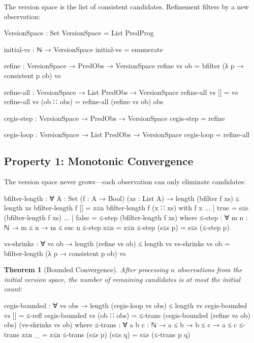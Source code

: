 \documentclass[9pt,a4paper]{article}
\theoremstyle{plain}
\newtheorem{theorem}{Theorem}
\theoremstyle{definition}
\theoremstyle{remark}
\begin{document}
The version space is the list of consistent candidates.  Refinement filters by a new observation:

\begin{code}
    VersionSpace : Set
    VersionSpace = List PredProg

    initial-vs : ℕ → VersionSpace
    initial-vs = enumerate

    refine : VersionSpace → PredObs → VersionSpace
    refine vs ob = bfilter (λ p → consistent p ob) vs

    refine-all : VersionSpace → List PredObs → VersionSpace
    refine-all vs []         = vs
    refine-all vs (ob ∷ obs) = refine-all (refine vs ob) obs

    cegis-step : VersionSpace → PredObs → VersionSpace
    cegis-step = refine

    cegis-loop : VersionSpace → List PredObs → VersionSpace
    cegis-loop = refine-all
\end{code}

\subsection{Property 1: Monotonic Convergence}

The version space never grows---each observation can only eliminate candidates:

\begin{code}
    bfilter-length : ∀ {A : Set} (f : A → Bool) (xs : List A) →
      length (bfilter f xs) ≤ length xs
    bfilter-length f []       = z≤n
    bfilter-length f (x ∷ xs) with f x
    ... | true  = s≤s (bfilter-length f xs)
    ... | false = ≤-step (bfilter-length f xs)
      where
        ≤-step : ∀ {m n : ℕ} → m ≤ n → m ≤ suc n
        ≤-step z≤n     = z≤n
        ≤-step (s≤s p) = s≤s (≤-step p)

    vs-shrinks : ∀ vs ob →
      length (refine vs ob) ≤ length vs
    vs-shrinks vs ob = bfilter-length (λ p → consistent p ob) vs
\end{code}

\begin{theorem}[Bounded Convergence]
After processing $n$ observations from the initial version space, the number of remaining candidates is at most the initial count:
\end{theorem}

\begin{code}
    cegis-bounded : ∀ vs obs →
      length (cegis-loop vs obs) ≤ length vs
    cegis-bounded vs []         = ≤-refl
    cegis-bounded vs (ob ∷ obs) =
      ≤-trans (cegis-bounded (refine vs ob) obs)
              (vs-shrinks vs ob)
      where
        ≤-trans : ∀ {a b c : ℕ} → a ≤ b → b ≤ c → a ≤ c
        ≤-trans z≤n     _       = z≤n
        ≤-trans (s≤s p) (s≤s q) = s≤s (≤-trans p q)
\end{code}
\end{document}
